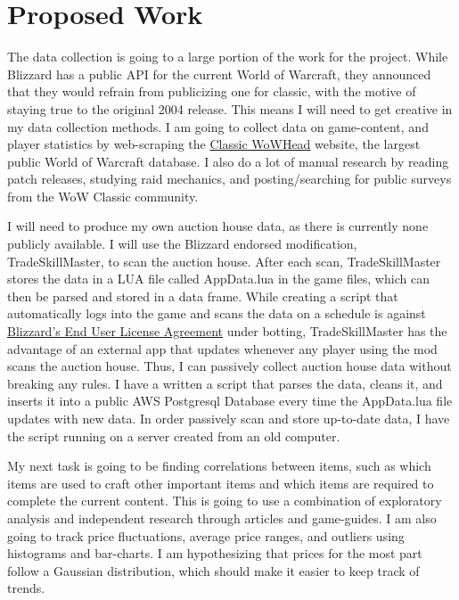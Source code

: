 \documentclass[sigconf]{acmart}
\begin{document}
\section{Proposed Work}
The data collection is going to a large portion of the work for the project. While Blizzard has a public API for the current World of Warcraft, they announced that they would refrain from publicizing one for classic, with the motive of staying true to the original 2004 release. This means I will need to get creative in my data collection methods. I am going to collect data on game-content, and player statistics by web-scraping the \href{https://classic.wowhead.com/}{Classic WoWHead} website, the largest public World of Warcraft database. I also do a lot of manual research by reading patch releases, studying raid mechanics, and posting/searching for public surveys from the WoW Classic community.

I will need to produce my own auction house data, as there is currently none publicly available. I will use the Blizzard endorsed modification, TradeSkillMaster, to scan the auction house. After each scan, TradeSkillMaster stores the data in a LUA file called AppData.lua in the game files, which can then be parsed and stored in a data frame. While creating a script that automatically logs into the game and scans the data on a schedule is against \href{https://www.blizzard.com/en-us/legal/fba4d00f-c7e4-4883-b8b9-1b4500a402ea/blizzard-end-user-license-agreement}{Blizzard’s End User License Agreement} under botting, TradeSkillMaster has the advantage of an external app that updates whenever any player using the mod scans the auction house. Thus, I can passively collect auction house data without breaking any rules. I have a written a script that parses the data, cleans it, and inserts it into a public AWS Postgresql Database every time the AppData.lua file updates with new data. In order passively scan and store up-to-date data, I have the script running on a server created from an old computer.

My next task is going to be finding correlations between items, such as which items are used to craft other important items and which items are required to complete the current content. This is going to use a combination of exploratory analysis and independent research through articles and game-guides. I am also going to track price fluctuations, average price ranges, and outliers using histograms and bar-charts. I am hypothesizing that prices for the most part follow a Gaussian distribution, which should make it easier to keep track of trends.
\end{document}
